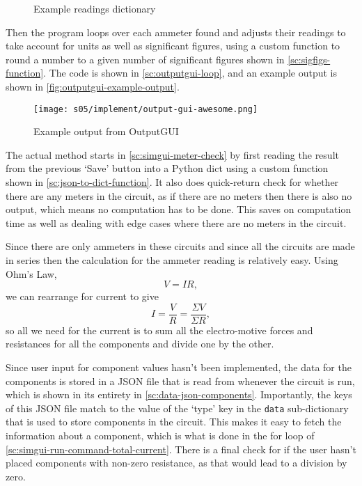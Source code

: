     \begin{figure}[!ht]
        \inputminted[linenos]{json}{figures/s05/implement/data.json}
        \caption{Example readings dictionary}
        \label{pc:readings-dict-example}
    \end{figure}

    Then the program loops over each ammeter found and adjusts their readings to take account for units as well as significant figures, using a custom function to round a number to a given number of significant figures shown in \autoref{sc:sigfigs-function}. 
    The code is shown in \autoref{sc:outputgui-loop}, and an example output is shown in \autoref{fig:outputgui-example-output}.

    \begin{figure}[!ht]
        \centering
        \texttt{[image: s05/implement/output-gui-awesome.png]}
        \caption{Example output from OutputGUI}
        \label{fig:outputgui-example-output}
    \end{figure}


    The actual method starts in \autoref{sc:simgui-meter-check} by first reading the result from the previous `Save' button into a Python dict using a custom function shown in \autoref{sc:json-to-dict-function}. 
    It also does quick-return check for whether there are any meters in the circuit, as if there are no meters then there is also no output, which means no computation has to be done. 
    This saves on computation time as well as dealing with edge cases where there are no meters in the circuit. 


    Since there are only ammeters in these circuits and since all the circuits are made in series then the calculation for the ammeter reading is relatively easy.
    Using Ohm's Law, \[ V = IR, \] we can rearrange for current to give \[ I = \frac{V }{R } = \frac{\Sigma V }{\Sigma R}, \] so all we need for the current is to sum all the electro-motive forces and resistances for all the components and divide one by the other. 

    Since user input for component values hasn't been implemented, the data for the components is stored in a JSON file that is read from whenever the circuit is run, which is shown in its entirety in \autoref{sc:data-json-components}. 
    Importantly, the keys of this JSON file match to the value of the `type' key in the \verb|data| sub-dictionary that is used to store components in the circuit.
    This makes it easy to fetch the information about a component, which is what is done in the for loop of \autoref{sc:simgui-run-command-total-current}. 
    There is a final check for if the user hasn't placed components with non-zero resistance, as that would lead to a division by zero. 

